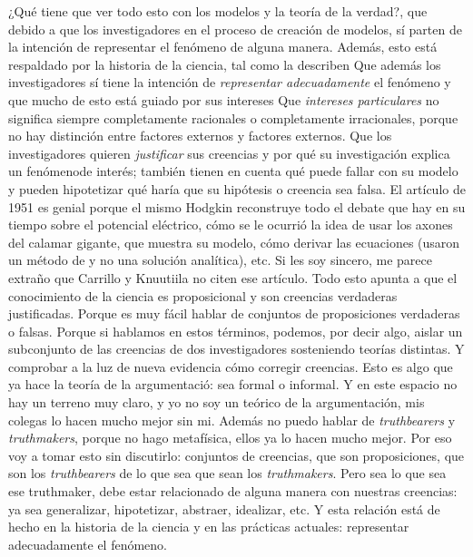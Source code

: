 ¿Qué tiene que ver todo esto con los modelos y la teoría de la verdad?, que debido a que los investigadores en el proceso de creación de modelos, sí parten de la intención de representar el fenómeno de alguna manera.
Además, esto está respaldado por la historia de la ciencia, tal como la describen %
Que además los investigadores sí tiene la intención de \emph{representar adecuadamente} el fenómeno y que mucho de esto está guiado por sus intereses %
Que \emph{intereses particulares} no significa siempre completamente racionales o completamente irracionales, porque no hay distinción entre factores externos y factores externos.
Que los investigadores quieren \emph{justificar} sus creencias y por qué su investigación explica un fenómenode interés; también tienen en cuenta qué puede fallar con su modelo y pueden hipotetizar qué haría que su hipótesis o creencia sea falsa.
El artículo de 1951 es genial porque el mismo Hodgkin reconstruye todo el debate que hay en su tiempo sobre el potencial eléctrico, cómo se le ocurrió la idea de usar los axones del calamar gigante, que muestra su modelo, cómo derivar las ecuaciones (usaron un método de  y no una solución analítica), etc.
Si les soy sincero, me parece extraño que Carrillo y Knuutiila no citen ese artículo.
Todo esto apunta a que el conocimiento de la ciencia es proposicional y son creencias verdaderas justificadas.
Porque es muy fácil hablar de conjuntos de proposiciones verdaderas o falsas.
Porque si hablamos en estos términos, podemos, por decir algo, aislar un subconjunto de las creencias de dos investigadores sosteniendo teorías distintas.
Y comprobar a la luz de nueva evidencia cómo corregir creencias.
Esto es algo que ya hace la teoría de la argumentació: sea formal o informal.
Y en este espacio no hay un terreno muy claro, y yo no soy un teórico de la argumentación, mis colegas lo hacen mucho mejor sin mi.
Además no puedo hablar de \emph{truthbearers} y \emph{truthmakers}, porque no hago metafísica, ellos ya lo hacen mucho mejor.
Por eso voy a tomar esto sin discutirlo: conjuntos de creencias, que son proposiciones, que son los \emph{truthbearers} de lo que sea que sean los \emph{truthmakers}.
Pero sea lo que sea ese truthmaker, debe estar relacionado de alguna manera con nuestras creencias: ya sea generalizar, hipotetizar, abstraer, idealizar, etc.
Y esta relación está de hecho en la historia de la ciencia y en las prácticas actuales: representar adecuadamente el fenómeno.
